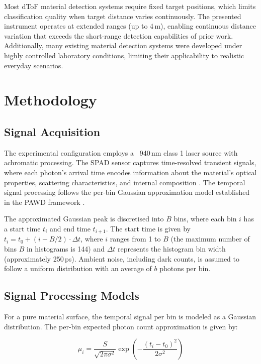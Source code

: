 \documentclass[10pt,twocolumn]{article}
\begin{document}
Most dToF material detection systems require fixed target positions, which limits classification quality when target distance varies continuously. The presented instrument operates at extended ranges (up to 4\,m), enabling continuous distance variation that exceeds the short-range detection capabilities of prior work. Additionally, many existing material detection systems were developed under highly controlled laboratory conditions, limiting their applicability to realistic everyday scenarios.

\section{Methodology}

\subsection{Signal Acquisition}

The experimental configuration employs a ~940\,nm class 1 laser source with achromatic processing. The SPAD sensor captures time-resolved transient signals, where each photon's arrival time encodes information about the material's optical properties, scattering characteristics, and internal composition \cite{tontini2020,koerner2021}. The temporal signal processing follows the per-bin Gaussian approximation model established in the PAWD framework \cite{tontini2020}.

The approximated Gaussian peak is discretised into $B$ bins, where each bin $i$ has a start time $t_i$ and end time $t_{i+1}$. The start time is given by $t_i = t_0 + (i - B/2) \cdot \Delta t$, where $i$ ranges from 1 to $B$ (the maximum number of bins $B$ in histograms is 144) and $\Delta t$ represents the histogram bin width (approximately 250\,ps). Ambient noise, including dark counts, is assumed to follow a uniform distribution with an average of $b$ photons per bin.

\subsection{Signal Processing Models}

For a pure material surface, the temporal signal per bin is modeled as a Gaussian distribution. The per-bin expected photon count approximation is given by:

\begin{equation}
\mu_i = \frac{S}{\sqrt{2\pi\sigma^2}} \exp\left(-\frac{(t_i - t_0)^2}{2\sigma^2}\right)
\label{eq:pure_material_gaussian}
\end{equation}
\end{document}
